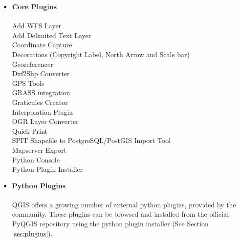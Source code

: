 \begin{itemize}
\item \textbf{Core Plugins}
\\ \\ Add WFS Layer
\\ Add Delimited Text Layer
\\ Coordinate Capture
\\ Decorations (Copyright Label, North Arrow and Scale bar)
\\ Georeferencer
\\ Dxf2Shp Converter
\\ GPS Tools
\\ GRASS integration
\\ Graticules Creator
\\ Interpolation Plugin
\\ OGR Layer Converter
\\ Quick Print
\\ SPIT Shapefile to PostgreSQL/PostGIS Import Tool
\\ Mapserver Export
\\ Python Console
\\ Python Plugin Installer
\\ \item \textbf{Python Plugins}
\\ \\ QGIS offers a growing number of external python plugins, provided by the
community. These plugins can be browsed and installed from the official
PyQGIS repository using the python plugin installer (See Section
\ref{sec:plugins}).
\end{itemize}

